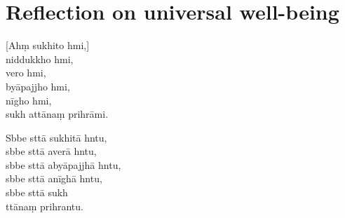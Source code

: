 %
%

\clearpage

\chapter[Universal well-being]{Reflection on universal well-being}

\begin{leader}
\end{leader}

[Ahṃ sukhito hmi,]\\
niddukkho hmi,\\
vero hmi,\\
byāpajjho hmi,\\
nīgho hmi,\\
sukh attānaṃ prihrāmi.

Sbbe sttā sukhitā hntu,\\
sbbe sttā averā hntu,\\
sbbe sttā abyāpajjhā hntu,\\
sbbe sttā anīghā hntu,\\
sbbe sttā sukh\\
ttānaṃ prihrantu.

